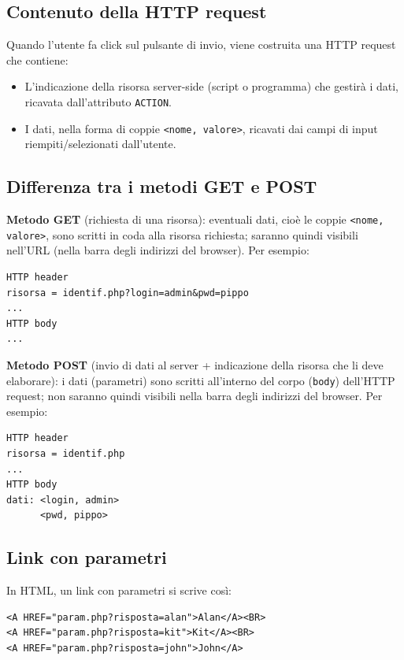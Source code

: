\subsection{Contenuto della HTTP request}

Quando l'utente fa click sul pulsante di invio, viene costruita una HTTP request che contiene:

\begin{itemize}
    \item L'indicazione della risorsa server-side (script o programma) che gestirà i dati, ricavata dall'attributo \texttt{ACTION}.
    \item I dati, nella forma di coppie \texttt{<nome, valore>}, ricavati dai campi di input riempiti/selezionati dall'utente.
\end{itemize}

\subsection{Differenza tra i metodi GET e POST}

\textbf{Metodo GET} (richiesta di una risorsa): eventuali dati, cioè le coppie \texttt{<nome, valore>}, sono scritti in coda alla risorsa richiesta; saranno quindi visibili nell'URL (nella barra degli indirizzi del browser). Per esempio:

\begin{verbatim}
HTTP header
risorsa = identif.php?login=admin&pwd=pippo
...
HTTP body
...
\end{verbatim}

\textbf{Metodo POST} (invio di dati al server + indicazione della risorsa che li deve elaborare): i dati (parametri) sono scritti all'interno del corpo (\texttt{body}) dell'HTTP request; non saranno quindi visibili nella barra degli indirizzi del browser. Per esempio:

\begin{verbatim}
HTTP header
risorsa = identif.php
...
HTTP body
dati: <login, admin>
      <pwd, pippo>
\end{verbatim}

\subsection{Link con parametri}

In HTML, un link con parametri si scrive così:

\begin{lstlisting}[language=HTML5]
<A HREF="param.php?risposta=alan">Alan</A><BR>
<A HREF="param.php?risposta=kit">Kit</A><BR>
<A HREF="param.php?risposta=john">John</A>
\end{lstlisting}

